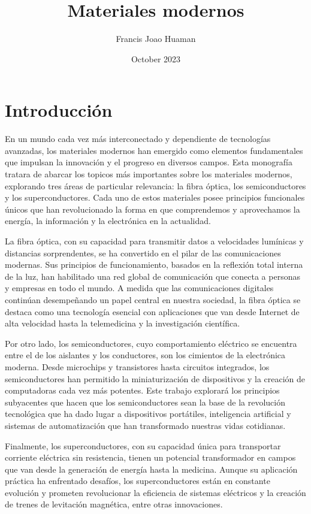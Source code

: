 \documentclass[10.5pt]{article}
\title{Materiales modernos}
\author{Francis Joao Huaman}
\date{October 2023}
\begin{document}
    
    \doublespacing
    \tableofcontents
    \pagebreak
    \section*{Introducción}
        En un mundo cada vez más interconectado y dependiente de tecnologías avanzadas, los materiales modernos han emergido como elementos fundamentales que impulsan la innovación y el progreso en diversos campos. Esta monografía tratara de abarcar los topicos más importantes sobre los materiales modernos, explorando tres áreas de particular relevancia: la fibra óptica, los semiconductores y los superconductores. Cada uno de estos materiales posee principios funcionales únicos que han revolucionado la forma en que comprendemos y aprovechamos la energía, la información y la electrónica en la actualidad.
        
        La fibra óptica, con su capacidad para transmitir datos a velocidades lumínicas y distancias sorprendentes, se ha convertido en el pilar de las comunicaciones modernas. Sus principios de funcionamiento, basados en la reflexión total interna de la luz, han habilitado una red global de comunicación que conecta a personas y empresas en todo el mundo. A medida que las comunicaciones digitales continúan desempeñando un papel central en nuestra sociedad, la fibra óptica se destaca como una tecnología esencial con aplicaciones que van desde Internet de alta velocidad hasta la telemedicina y la investigación científica.
    
        Por otro lado, los semiconductores, cuyo comportamiento eléctrico se encuentra entre el de los aislantes y los conductores, son los cimientos de la electrónica moderna. Desde microchips y transistores hasta circuitos integrados, los semiconductores han permitido la miniaturización de dispositivos y la creación de computadoras cada vez más potentes. Este trabajo explorará los principios subyacentes que hacen que los semiconductores sean la base de la revolución tecnológica que ha dado lugar a dispositivos portátiles, inteligencia artificial y sistemas de automatización que han transformado nuestras vidas cotidianas.
    
        Finalmente, los superconductores, con su capacidad única para transportar corriente eléctrica sin resistencia, tienen un potencial transformador en campos que van desde la generación de energía hasta la medicina. Aunque su aplicación práctica ha enfrentado desafíos, los superconductores están en constante evolución y prometen revolucionar la eficiencia de sistemas eléctricos y la creación de trenes de levitación magnética, entre otras innovaciones.
    
\end{document}
